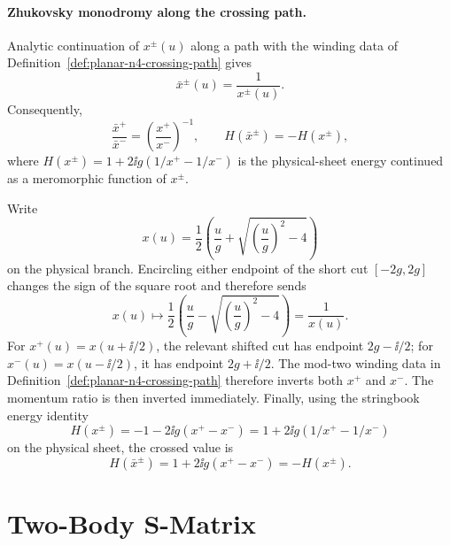 \paragraph{Zhukovsky monodromy along the crossing path.}
Analytic continuation of \(x^\pm(u)\) along a path with the winding data of
Definition~\ref{def:planar-n4-crossing-path} gives
\[
  \bar x^\pm(u)=\frac{1}{x^\pm(u)} .
\]
Consequently,
\[
  \frac{\bar x^+}{\bar x^-}
  =
  \left(\frac{x^+}{x^-}\right)^{-1},
  \qquad
  H(\bar x^\pm)=-H(x^\pm),
\]
where \(H(x^\pm)=1+2\ii g(1/x^+-1/x^-)\) is the physical-sheet energy
continued as a meromorphic function of \(x^\pm\).

Write
\[
  x(u)=\frac12\left(\frac{u}{g}
  +\sqrt{\left(\frac{u}{g}\right)^2-4}\right)
\]
on the physical branch.  Encircling either endpoint of the short cut
\([-2g,2g]\) changes the sign of the square root and therefore sends
\[
  x(u)\longmapsto
  \frac12\left(\frac{u}{g}
  -\sqrt{\left(\frac{u}{g}\right)^2-4}\right)
  =
  \frac1{x(u)} .
\]
For \(x^+(u)=x(u+\ii/2)\), the relevant shifted cut has endpoint
\(2g-\ii/2\); for \(x^-(u)=x(u-\ii/2)\), it has endpoint \(2g+\ii/2\).
The mod-two winding data in Definition~\ref{def:planar-n4-crossing-path}
therefore inverts both \(x^+\) and \(x^-\).  The momentum ratio is then
inverted immediately.  Finally, using the stringbook energy identity
\[
  H(x^\pm)=-1-2\ii g(x^+-x^-)
  =
  1+2\ii g(1/x^+-1/x^-)
\]
on the physical sheet, the crossed value is
\[
  H(\bar x^\pm)
  =
  1+2\ii g(x^+-x^-)
  =
  -H(x^\pm).
\]

\section{Two-Body S-Matrix}

